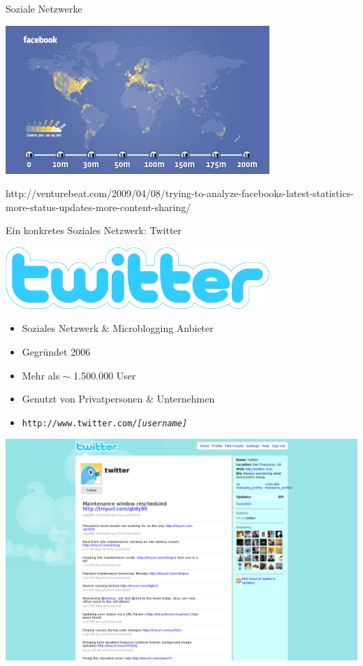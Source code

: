 \documentclass[11pt]{beamer}
\begin{document}
\begin{frame}[t]{Soziale Netzwerke}
  \begin{center}
    \includegraphics[width=0.75\textwidth]{fbmap}

    {\tiny
    http://venturebeat.com/2009/04/08/trying-to-analyze-facebooks-latest-statistics-more-status-updates-more-content-sharing/
    }
  \end{center}
\end{frame}

\begin{frame}[t]{Ein konkretes Soziales Netzwerk: Twitter}
  \begin{center}
    \includegraphics[width=0.75\textwidth]{twitter_logo}
  \end{center}
  \begin{itemize}
    \item Soziales Netzwerk \& Microblogging Anbieter
    \item Gegründet 2006
    \item Mehr als $\sim$ 1.500.000 User
    \item Genutzt von Privatpersonen \& Unternehmen
    \item \texttt{http://www.twitter.com/\textit{[username]}}
  \end{itemize}
\end{frame}

\begin{frame}[t]
  \begin{center}
    \includegraphics[width=\textwidth]{twitter_home}
  \end{center}
\end{frame}
\end{document}
